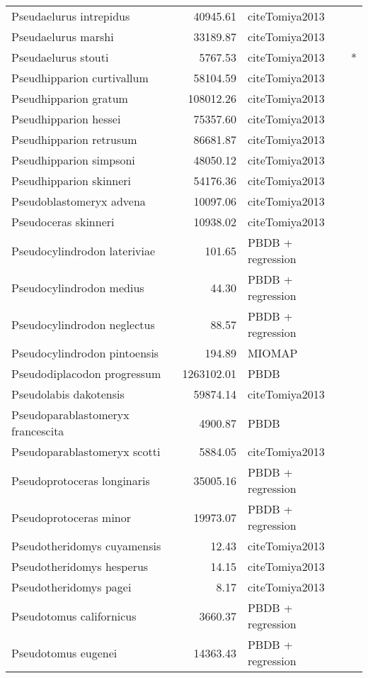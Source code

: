 \begin{table}[ht]
\begin{tabular}{lrll}
  Pseudaelurus intrepidus & 40945.61 & cite{Tomiya2013} &  \\ 
  Pseudaelurus marshi & 33189.87 & cite{Tomiya2013} &  \\ 
  Pseudaelurus stouti & 5767.53 & cite{Tomiya2013} & * \\ 
  Pseudhipparion curtivallum & 58104.59 & cite{Tomiya2013} &  \\ 
  Pseudhipparion gratum & 108012.26 & cite{Tomiya2013} &  \\ 
  Pseudhipparion hessei & 75357.60 & cite{Tomiya2013} &  \\ 
  Pseudhipparion retrusum & 86681.87 & cite{Tomiya2013} &  \\ 
  Pseudhipparion simpsoni & 48050.12 & cite{Tomiya2013} &  \\ 
  Pseudhipparion skinneri & 54176.36 & cite{Tomiya2013} &  \\ 
  Pseudoblastomeryx advena & 10097.06 & cite{Tomiya2013} &  \\ 
  Pseudoceras skinneri & 10938.02 & cite{Tomiya2013} &  \\ 
  Pseudocylindrodon lateriviae & 101.65 & PBDB + regression &  \\ 
  Pseudocylindrodon medius & 44.30 & PBDB + regression &  \\ 
  Pseudocylindrodon neglectus & 88.57 & PBDB + regression &  \\ 
  Pseudocylindrodon pintoensis & 194.89 & MIOMAP &  \\ 
  Pseudodiplacodon progressum & 1263102.01 & PBDB &  \\ 
  Pseudolabis dakotensis & 59874.14 & cite{Tomiya2013} &  \\ 
  Pseudoparablastomeryx francescita & 4900.87 & PBDB &  \\ 
  Pseudoparablastomeryx scotti & 5884.05 & cite{Tomiya2013} &  \\ 
  Pseudoprotoceras longinaris & 35005.16 & PBDB + regression &  \\ 
  Pseudoprotoceras minor & 19973.07 & PBDB + regression &  \\ 
  Pseudotheridomys cuyamensis & 12.43 & cite{Tomiya2013} &  \\ 
  Pseudotheridomys hesperus & 14.15 & cite{Tomiya2013} &  \\ 
  Pseudotheridomys pagei & 8.17 & cite{Tomiya2013} &  \\ 
  Pseudotomus californicus & 3660.37 & PBDB + regression &  \\ 
  Pseudotomus eugenei & 14363.43 & PBDB + regression &  \\ 

\end{tabular}
\end{table}
